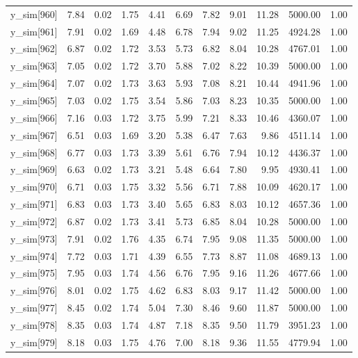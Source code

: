\begin{table}[ht]
\begin{tabular}{rrrrrrrrrrr}
  y\_sim[960] & 7.84 & 0.02 & 1.75 & 4.41 & 6.69 & 7.82 & 9.01 & 11.28 & 5000.00 & 1.00 \\ 
  y\_sim[961] & 7.91 & 0.02 & 1.69 & 4.48 & 6.78 & 7.94 & 9.02 & 11.25 & 4924.28 & 1.00 \\ 
  y\_sim[962] & 6.87 & 0.02 & 1.72 & 3.53 & 5.73 & 6.82 & 8.04 & 10.28 & 4767.01 & 1.00 \\ 
  y\_sim[963] & 7.05 & 0.02 & 1.72 & 3.70 & 5.88 & 7.02 & 8.22 & 10.39 & 5000.00 & 1.00 \\ 
  y\_sim[964] & 7.07 & 0.02 & 1.73 & 3.63 & 5.93 & 7.08 & 8.21 & 10.44 & 4941.96 & 1.00 \\ 
  y\_sim[965] & 7.03 & 0.02 & 1.75 & 3.54 & 5.86 & 7.03 & 8.23 & 10.35 & 5000.00 & 1.00 \\ 
  y\_sim[966] & 7.16 & 0.03 & 1.72 & 3.75 & 5.99 & 7.21 & 8.33 & 10.46 & 4360.07 & 1.00 \\ 
  y\_sim[967] & 6.51 & 0.03 & 1.69 & 3.20 & 5.38 & 6.47 & 7.63 & 9.86 & 4511.14 & 1.00 \\ 
  y\_sim[968] & 6.77 & 0.03 & 1.73 & 3.39 & 5.61 & 6.76 & 7.94 & 10.12 & 4436.37 & 1.00 \\ 
  y\_sim[969] & 6.63 & 0.02 & 1.73 & 3.21 & 5.48 & 6.64 & 7.80 & 9.95 & 4930.41 & 1.00 \\ 
  y\_sim[970] & 6.71 & 0.03 & 1.75 & 3.32 & 5.56 & 6.71 & 7.88 & 10.09 & 4620.17 & 1.00 \\ 
  y\_sim[971] & 6.83 & 0.03 & 1.73 & 3.40 & 5.65 & 6.83 & 8.03 & 10.12 & 4657.36 & 1.00 \\ 
  y\_sim[972] & 6.87 & 0.02 & 1.73 & 3.41 & 5.73 & 6.85 & 8.04 & 10.28 & 5000.00 & 1.00 \\ 
  y\_sim[973] & 7.91 & 0.02 & 1.76 & 4.35 & 6.74 & 7.95 & 9.08 & 11.35 & 5000.00 & 1.00 \\ 
  y\_sim[974] & 7.72 & 0.03 & 1.71 & 4.39 & 6.55 & 7.73 & 8.87 & 11.08 & 4689.13 & 1.00 \\ 
  y\_sim[975] & 7.95 & 0.03 & 1.74 & 4.56 & 6.76 & 7.95 & 9.16 & 11.26 & 4677.66 & 1.00 \\ 
  y\_sim[976] & 8.01 & 0.02 & 1.75 & 4.62 & 6.83 & 8.03 & 9.17 & 11.42 & 5000.00 & 1.00 \\ 
  y\_sim[977] & 8.45 & 0.02 & 1.74 & 5.04 & 7.30 & 8.46 & 9.60 & 11.87 & 5000.00 & 1.00 \\ 
  y\_sim[978] & 8.35 & 0.03 & 1.74 & 4.87 & 7.18 & 8.35 & 9.50 & 11.79 & 3951.23 & 1.00 \\ 
  y\_sim[979] & 8.18 & 0.03 & 1.75 & 4.76 & 7.00 & 8.18 & 9.36 & 11.55 & 4779.94 & 1.00 \\ 

\end{tabular}
\end{table}
